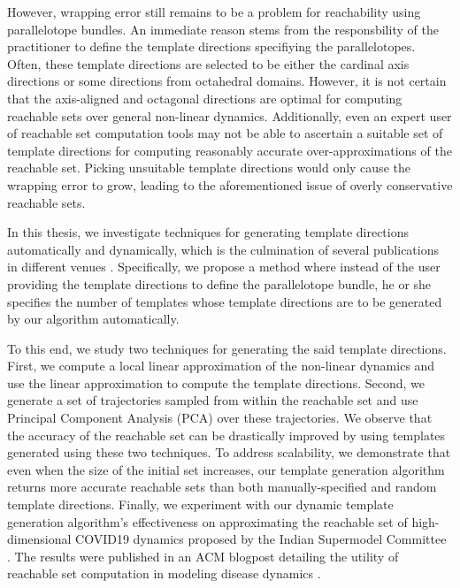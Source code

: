 However, wrapping error still remains to be a problem for reachability using parallelotope bundles.
%
An immediate reason stems from the responsbility of the practitioner to define the template directions specifiying the parallelotopes.
%
Often, these template directions are selected to be either the cardinal axis directions or some directions from octahedral domains.
%
However, it is not certain that the axis-aligned and octagonal directions are optimal for computing reachable sets over general non-linear dynamics.
%
Additionally, even an expert user of reachable set computation tools may not be able to ascertain a suitable set of template directions for computing reasonably accurate over-approximations of the reachable set.
%
Picking unsuitable template directions would only cause the wrapping error to grow, leading to the aforementioned issue of overly conservative reachable sets.

In this thesis, we investigate techniques for generating template directions automatically and dynamically, which is the culmination of several publications in different venues \cite{kim2020kaa,kim2021automatic,geretti2021arch}.
%
Specifically, we propose a method where instead of the user providing the template directions to define the parallelotope bundle, he or she specifies the number of templates whose template directions are to be generated by our algorithm automatically.

To this end, we study two techniques for generating the said template directions.
%
First, we compute a local linear approximation of the non-linear dynamics and use the linear approximation to compute the template directions.
%
Second, we generate a set of trajectories sampled from within the reachable set and use Principal Component Analysis (PCA) over these trajectories.
%
We observe that the accuracy of the reachable set can be drastically improved by using templates generated using these two techniques.
%
To address scalability, we demonstrate that even when the size of the initial set increases, our template generation algorithm returns more accurate reachable sets than both manually-specified and random template directions.
%
Finally, we experiment with our dynamic template generation algorithm's effectiveness on approximating the reachable set of high-dimensional COVID19 dynamics proposed by the Indian Supermodel Committee \cite{indiansuper2020supermodel}. The results were published in an ACM blogpost detailing the utility of reachable set computation in modeling disease dynamics \cite{bak2021covid}.

